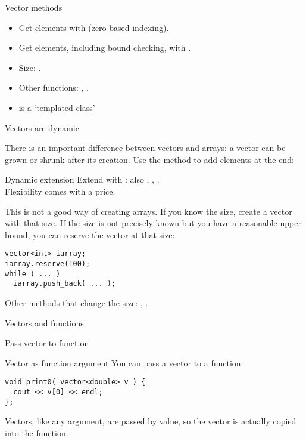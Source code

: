 \begin{slide}{Vector methods}
  \label{sl:vector-method}
  \begin{itemize}
  \item Get elements with  (zero-based indexing).
  \item Get elements, including bound checking, with .
  \item Size: .
  \item Other functions: , .
  \item {} is a `templated class'
  \end{itemize}
\end{slide}

 {Vectors are dynamic}
\label{sec:stdvector-dynamic}

There is an important difference between vectors and arrays: a vector
can be grown or shrunk after its creation.
Use the  method to add elements at the end:

\begin{block}{Dynamic extension}
  \label{sl:vector-dynamic}
  Extend with :
  also , , .\\
  Flexibility comes with a price.
\end{block}

This is not a good way of creating arrays. If you know the size,
create a vector with that size. If the size is not precisely known but
you have a reasonable upper bound, you can 
reserve the vector at that size:
\begin{verbatim}
vector<int> iarray;
iarray.reserve(100);
while ( ... )
  iarray.push_back( ... );
\end{verbatim}

Other methods that change the size: , .

 {Vectors and functions}

 {Pass vector to function}

\begin{block}{Vector as function argument}
  \label{sl:vector-arg}
  You can pass a vector to a function:
\begin{verbatim}
void print0( vector<double> v ) {
  cout << v[0] << endl;
};
\end{verbatim}
Vectors, like any argument, are passed by value, so the vector is
actually copied into the function.
\end{block}

